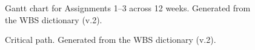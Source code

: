 \begin{landscape}
\begin{figure}[H]
  \centering
  \caption[Gantt chart for Assignments 1–3 across 12 weeks]{Gantt chart for Assignments 1–3 across 12 weeks. Generated from the WBS dictionary (v.2).}
  \label{fig:gantt}
\end{figure}
\clearpage
\begin{figure}[H]
  \centering
  \caption[Critical path]{Critical path. Generated from the WBS dictionary (v.2).}
  \label{fig:cpm}
\end{figure}
\end{landscape}
